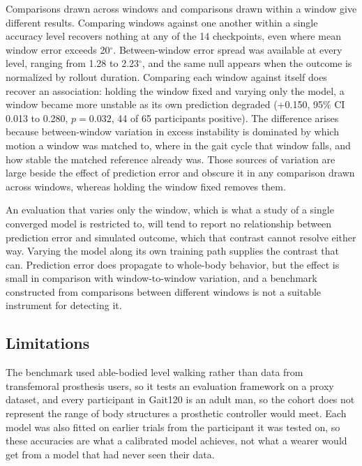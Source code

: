 \documentclass[referee,lineno,pdflatex,sn-vancouver-num]{sn-jnl}
\begin{document}
Comparisons drawn across windows and comparisons drawn within a window
give different results. Comparing windows against one another
within a single accuracy level recovers nothing at any of the
14 checkpoints, even where mean window error exceeds
20$^{\circ}$.
Between-window error spread was available at every level, ranging from
1.28
to 2.23$^{\circ}$,
and the same null appears when the outcome is normalized by rollout duration.
Comparing each window against itself does recover an association: holding the
window fixed and varying only the model, a window became more unstable as its own
prediction degraded
(+0.150,
95\% CI 0.013 to 0.280, $p=0.032$,
44 of 65 participants
positive). The
difference arises because between-window variation in excess instability is
dominated by which motion a window was matched to, where in the gait cycle that
window falls, and how stable the matched reference already was. Those sources of
variation are large beside the effect of prediction error and obscure it in any
comparison drawn across windows, whereas holding the window fixed removes them.

An evaluation that varies only the
window, which is what a study
of a single converged model is restricted to, will tend to report no relationship
between prediction error and simulated outcome, which that contrast cannot
resolve either way. Varying the model along its own
training path supplies the contrast that can. Prediction error does propagate to
whole-body behavior, but the effect is small in comparison with window-to-window
variation, and a benchmark constructed from comparisons between different windows
is not a suitable instrument for detecting it.

\subsection{Limitations}

The benchmark used able-bodied level walking rather than data from transfemoral
prosthesis users, so it tests an evaluation framework on a proxy dataset, and
every participant in Gait120 is an adult man, so the cohort does not represent
the range of body structures a prosthetic controller would meet. Each
model was also fitted on earlier trials from the participant it was tested on, so
these accuracies are what a calibrated model achieves, not what a wearer would get
from a model that had never seen their data.
\end{document}
